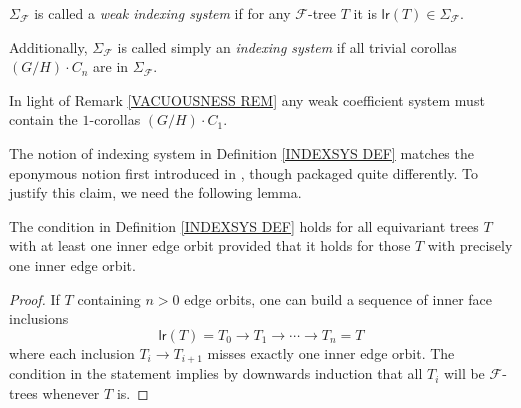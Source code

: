 \documentclass[a4paper,10pt]{article}%
\begin{document}
\begin{definition}\label{INDEXSYS DEF}
  $\Sigma_{\mathcal{F}}$ is called a 
  \textit{weak indexing system}
  if for any $\mathcal{F}$-tree $T$ it is 
  $\mathsf{lr}(T) \in \Sigma_{\mathcal{F}}$.
  
  Additionally, $\Sigma_{\mathcal{F}}$ is called simply an \textit{indexing system} if all trivial corollas 
  $(G/H)\cdot C_n$ are in $\Sigma_{\mathcal{F}}$.
\end{definition}


\begin{remark}
  In light of Remark \ref{VACUOUSNESS REM} any weak coefficient system must contain the $1$-corollas $(G/H) \cdot C_1$.
\end{remark}

The notion of indexing system in Definition \ref{INDEXSYS DEF} matches the eponymous notion first introduced in 
\cite[Def. 3.22]{BH15}, though packaged quite differently.
To justify this claim, we need the following lemma.


\begin{lemma}
  The condition in Definition \ref{INDEXSYS DEF}
  holds for all equivariant trees $T$ with at least one inner edge orbit provided that it holds for those $T$ with precisely one inner edge orbit.
\end{lemma}


\begin{proof}
  If $T$ containing $n>0$ edge orbits, one can build a sequence of inner face inclusions
  \[
  \mathsf{lr}(T) = T_0
  \to
  T_1
  \to 
  \cdots
  \to
  T_n= T
  \]
  where each inclusion $T_i \to T_{i+1}$ misses exactly one inner edge orbit. The condition in the statement implies by downwards induction that all $T_i$ will be $\mathcal{F}$-trees whenever $T$ is.
\end{proof}
\end{document}
